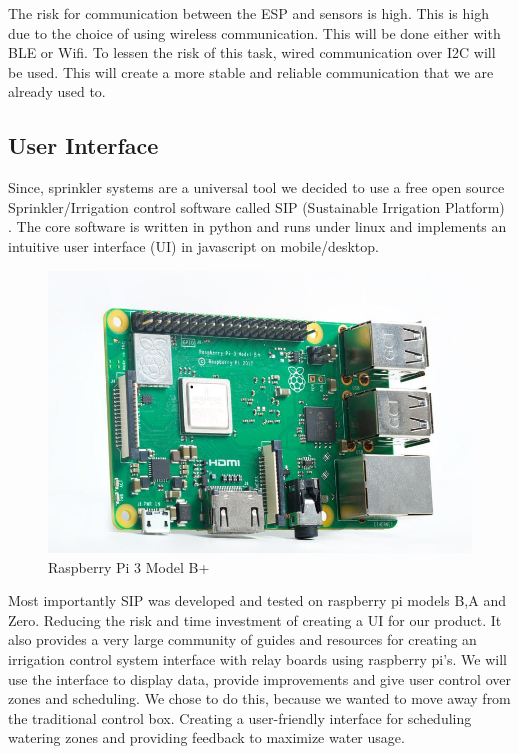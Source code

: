 \documentclass[letterpaper, 10 pt, conference]{ieeeconf}  %
\begin{document}
The risk for communication between the ESP and sensors is high. This is high due to the choice of using wireless communication. This will be done either with BLE or Wifi. To lessen the risk of this task, wired communication over I2C will be used. This will create a more stable and reliable communication that we are already used to. 

\subsection{User Interface}
Since, sprinkler systems are a universal tool we decided to use a free open source Sprinkler/Irrigation control software called SIP (Sustainable Irrigation Platform) \cite{SIP}. The core software is written in python and runs under linux and implements an intuitive user interface (UI) in javascript on mobile/desktop. 

\begin{figure}
    \centering
    \includegraphics[scale=.3]{RaspberryPIB.jpg}
    \caption{Raspberry Pi 3 Model B+}
    \label{fig:pi_label}
\end{figure}

Most importantly SIP was developed and tested on raspberry pi models B,A and Zero. Reducing the risk and time investment of creating a UI for our product. It also provides a very large community of guides and resources for creating an irrigation control system interface with relay boards using raspberry pi's. We will use the interface to display data, provide improvements and give user control over zones and scheduling. We chose to do this, because we wanted to move away from the traditional control box. Creating a user-friendly interface for scheduling watering zones and providing feedback to maximize water usage.
\end{document}
